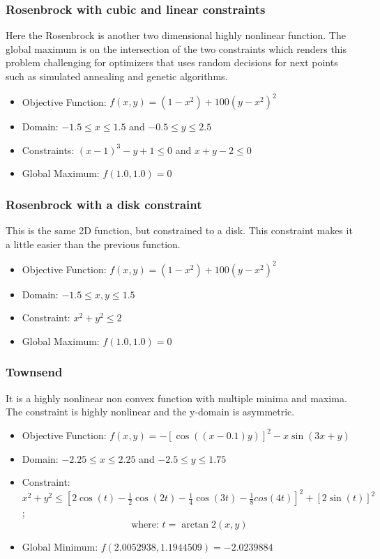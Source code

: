 \subsubsection{Rosenbrock with cubic and linear constraints}
Here the Rosenbrock is another two dimensional highly nonlinear function. The global maximum is on the intersection of the two constraints which renders this problem challenging for optimizers that uses random decisions for next points such as simulated annealing and genetic algorithms.
\begin{itemize}
	\item Objective Function: $f(x,y) = (1-x^2) + 100(y-x^2)^2$
	\item Domain: $-1.5 \leq x \leq 1.5$ and $ -0.5 \leq y \leq 2.5$
	\item Constraints: $(x-1)^3 - y +1 \leq 0$ and $x+y-2 \leq 0$
	\item Global Maximum: $f(1.0,1.0) = 0$
\end{itemize}

\subsubsection{Rosenbrock with a disk constraint}
This is the same 2D function, but constrained to a disk. This constraint makes it a little easier than the previous function.
\begin{itemize}
	\item Objective Function: $f(x,y) = (1-x^2) + 100(y-x^2)^2$
	\item Domain: $-1.5 \leq x,y \leq 1.5$
	\item Constraint: $x^2 + y^2 \leq 2$
	\item Global Maximum: $f(1.0,1.0) = 0$
\end{itemize}

\subsubsection{Townsend}
It is a highly nonlinear non convex function with multiple minima and maxima. The constraint is highly nonlinear and the y-domain is asymmetric.
\begin{itemize}
	\item Objective Function: $f(x,y) = -\left[\cos((x-0.1)y)\right]^2-x\sin(3x+y)$
	\item Domain: $-2.25 \leq x \leq 2.25$ and $-2.5 \leq y \leq 1.75$
	\item Constraint: $x^2 + y^2 \leq \left[2\cos(t)-\frac{1}{2}\cos(2t)-\frac{1}{4}\cos(3t) - \frac{1}{8}cos(4t) \right]^2+\left[2\sin(t)\right]^2 $;  \[ \text{where: } t=\arctan2(x,y) \]
	\item Global Minimum: $f(2.0052938,1.1944509) = -2.0239884$
\end{itemize}

